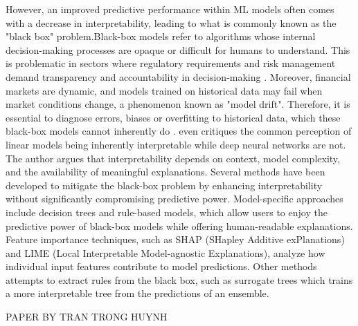 However, an improved predictive performance within ML models often comes with a decrease in interpretability,  leading to what is commonly known as the "black box" problem.Black-box models refer to algorithms whose internal decision-making processes are opaque or difficult for humans to understand. This is problematic in sectors where regulatory requirements and risk management demand transparency and accountability in decision-making \cite{brozek_2024}.  Moreover, financial markets are dynamic, and models trained on historical data may fail when market conditions change, a phenomenon known as "model drift". Therefore, it is essential to diagnose errors, biases or overfitting to historical data, which these black-box models cannot inherently do \cite{cohen_2021}.  even critiques the common perception of linear models being inherently interpretable while deep neural networks are not. The author argues that interpretability depends on context, model complexity, and the availability of meaningful explanations. Several methods have been developed to mitigate the black-box problem by enhancing interpretability without significantly compromising predictive power. Model-specific approaches include decision trees and rule-based models, which allow users to enjoy the predictive power of black-box models while offering human-readable explanations. Feature importance techniques, such as SHAP (SHapley Additive exPlanations) and LIME (Local Interpretable Model-agnostic Explanations), analyze how individual input features contribute to model predictions. Other methods attempts to extract rules from the black box, such as surrogate trees which trains a more interpretable tree from the predictions of an ensemble.

PAPER BY TRAN TRONG HUYNH

